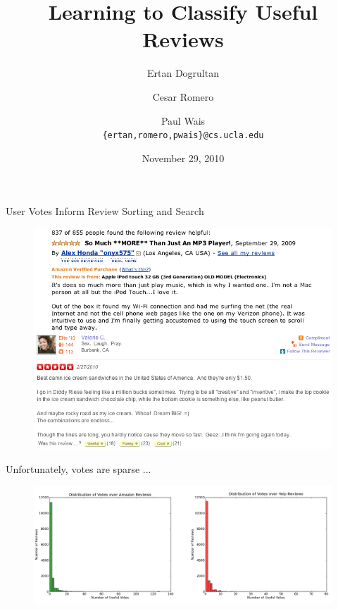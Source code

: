 \documentclass{beamer}
\title{Learning to Classify Useful Reviews}
\author{Ertan Dogrultan \and Cesar Romero \and Paul Wais\\
\texttt{\{ertan,romero,pwais\}@cs.ucla.edu}}
\date{November 29, 2010}
\begin{document}
\maketitle{}

\begin{frame}{User Votes Inform Review Sorting and Search}
\begin{figure}[h]
  \centering
  \includegraphics[scale=.4]{review_ex_1}
  \label{fig:dist}
\end{figure}
\end{frame}

\begin{frame}{Unfortunately, votes are sparse ...}
\begin{figure}[h]
  \centering
  \includegraphics[width=\linewidth]{histos}
  \label{fig:dist}
\end{figure}
\end{frame}
\end{document}
